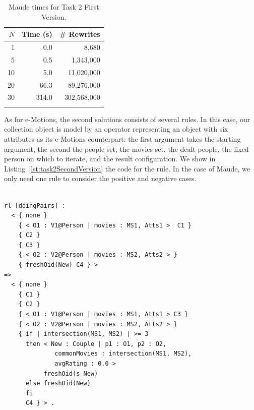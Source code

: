 \begin{table}[htb]
\renewcommand{\tabcolsep}{6pt}
\renewcommand{\arraystretch}{1.2}
    \centering
	\begin{tabular}{r r r}
	$N$ & Time (s) & \# Rewrites \\
	\hline
	1 & 0.0 & 8,680 \\
	5 & 0.5 & 1,343,000 \\
	10 & 5.0 & 11,020,000 \\
	20 & 66.3 & 89,276,000 \\
	30 & 314.0 & 302,568,000 \\
	\hline \\
	\end{tabular}
	\caption{Maude times for Task 2 First Version.}\label{table:maudetask21}
\end{table}

As for e-Motions, the second solutions consists of several rules. In this case, our collection object is model by an operator \code{\{\_\}\{\_\}\{\_\}\{\_\}\{\_\}\{\_\}} representing an object with six attributes as its e-Motions counterpart: the first argument takes the starting argument, the second the people set, the movies set, the dealt people, the fixed person on which to iterate, and the result configuration. We show in Listing~\ref{lst:task2SecondVersion} the code for the  rule. In the case of Maude, we only need one rule to consider the positive and negative cases. 

\begin{lstlisting}[caption=\code{doingCouples} Maude rule., label=lst:task2SecondVersion]

rl [doingPairs] :
  < { none }
    { < O1 : V1@Person | movies : MS1, Atts1 >  C1 }
    { C2 }
    { C3 }
    { < O2 : V2@Person | movies : MS2, Atts2 > }
    { freshOid(New) C4 } >
=> 
  < { none }
    { C1 }
    { C2 }
    { < O1 : V1@Person | movies : MS1, Atts1 > C3 }
    { < O2 : V2@Person | movies : MS2, Atts2 > }
    { if | intersection(MS1, MS2) | >= 3 
      then < New : Couple | p1 : O1, p2 : O2, 
              commonMovies : intersection(MS1, MS2), 
              avgRating : 0.0 >
           freshOid(s New)
      else freshOid(New)
      fi 
      C4 } > .
\end{lstlisting}
